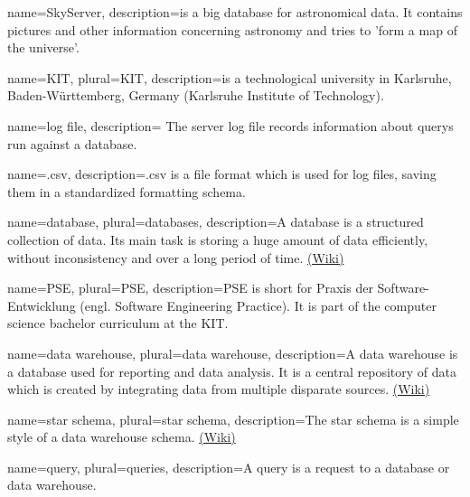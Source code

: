 {
  name=SkyServer,
  description={is a big \gls{database} for astronomical data. It contains pictures
              and other information concerning astronomy and tries to 'form a 
              map of the universe'.
              }
}


{
  name=KIT,
  plural=KIT,
  description={is a technological university in Karlsruhe, Baden-Württemberg, Germany 
              (Karlsruhe Institute of Technology).}
}


{
  name=log file,
  description={
The server log file records information about \glspl{query} run against a  \gls{database}.}
}


{
  name=.csv,
  description={.csv is a file format which is used for log files, 
  saving them in a standardized formatting schema.}
}


{
  name=database,
  plural=databases,
  description={A database is a structured collection of data. Its main task is
  storing a huge amount of data efficiently, without inconsistency and over a long period of time.   
  \href{https://en.wikipedia.org/wiki/Database}{(Wiki)}}
}


{
  name=PSE,
  plural=PSE,
  description={PSE is short for Praxis der Software-Entwicklung (engl. Software Engineering Practice).
  It is part of the computer science bachelor curriculum at the \gls{KIT}.}
}


{
  name=data warehouse,
  plural=data warehouse,
  description={A data warehouse is a \gls{database} used for reporting and data analysis.
  It is a central repository of data which is created by integrating data from multiple disparate sources.
  \href{https://en.wikipedia.org/wiki/Data_warehouse}{(Wiki)}}
}
  
  
{
  name=star schema,
  plural=star schema,
  description={The star schema is a simple style of a \gls{data warehouse} schema.
 \href{https://en.wikipedia.org/wiki/Star_schema}{(Wiki)}}
}

  
{
  name=query,
  plural=queries,
  description={A query is a request to a \gls{database} or \gls{data warehouse}.}
}


